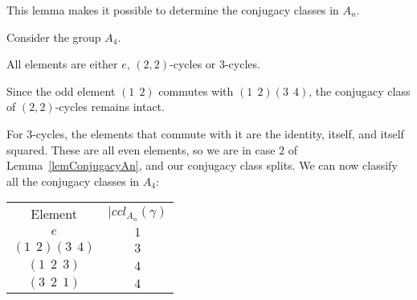 \documentclass[../Main.tex]{subfiles}
\begin{document}
This lemma makes it possible to determine the conjugacy classes in $A_n$.
\begin{example}
    Consider the group $A_4$.\par
    All elements are either $e$, $(2, 2)$-cycles or $3$-cycles.\par
    Since the odd element $(1~~2)$ commutes with $(1~~2)(3~~4)$, the conjugacy class of $(2, 2)$-cycles remains intact.\par
    For $3$-cycles, the elements that commute with it are the identity, itself, and itself squared. These are all even elements, so we are in case 2 of Lemma~\ref{lemConjugacyAn}, and our conjugacy class splits.
    We can now classify all the conjugacy classes in $A_4$:\par
    \begin{tabular}{c|c}
        Element & $|ccl_{A_n}(\gamma)$ \\
        $e$ & $1$ \\
        $(1~~2)(3~~4)$ & $3$ \\
        $(1~~2~~3)$ & $4$ \\
        $(3~~2~~1)$ & $4$ 
    \end{tabular}
\end{example}
\end{document}
